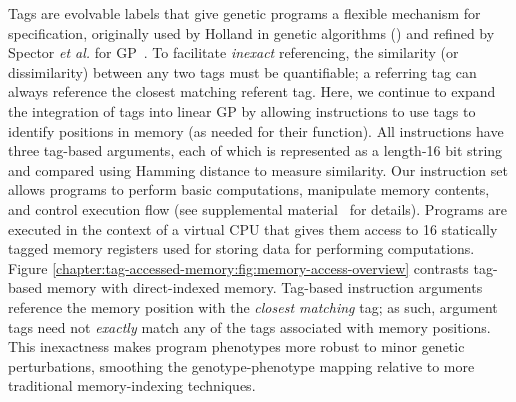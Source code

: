 Tags are evolvable labels that give genetic programs a flexible mechanism for specification, originally used by Holland in genetic algorithms (\citep{holland_effect_1993}) and refined by Spector \textit{et al.} for GP~\citep{spector_tag-based_2011}.
To facilitate \textit{inexact} referencing, the similarity (or dissimilarity) between any two tags must be quantifiable; a referring tag can always reference the closest matching referent tag.
Here, we continue to expand the integration of tags into linear GP by allowing instructions to use tags to identify positions in memory (as needed for their function).
All instructions have three tag-based arguments, each of which is represented as a length-16 bit string and compared using Hamming distance to measure similarity.
Our instruction set allows programs to perform basic computations, manipulate memory contents, and control execution flow (see supplemental material~\citep{tag_accessed_memory_supplement_2019} for details).
Programs are executed in the context of a virtual CPU that gives them access to 16 statically tagged memory registers used for storing data for performing computations.
Figure \ref{chapter:tag-accessed-memory:fig:memory-access-overview} contrasts tag-based memory with direct-indexed memory.
Tag-based instruction arguments reference the memory position with the \textit{closest matching} tag; as such, argument tags need not \textit{exactly} match any of the tags associated with memory positions.
This inexactness makes program phenotypes more robust to minor genetic perturbations, smoothing the genotype-phenotype mapping relative to more traditional memory-indexing techniques.

